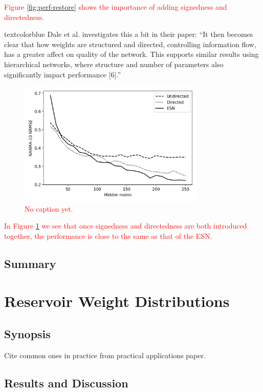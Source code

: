 \textcolor{red}{
  Figure \ref{fig:perf-restore} shows the importance of adding signedness and
directedness.
}

textcolor{blue}{
  Dale et al. investigates this a bit in their paper: ``It then becomes clear
that how weights are structured and directed, controlling information flow, has
a greater affect on quality of the network. This supports similar results using
hierarchical networks, where structure and number of parameters also
significantly impact performance [6].''
}

\begin{figure}[t]
  \centering
  \includegraphics[width=3.5in]{figures/perf-rest-comp.png}
  \caption{
    \textcolor{red}{
      No caption yet.
    }
  }
  \label{fig:perf-rest-comp}
\end{figure}

\textcolor{red}{
  In Figure \ref{fig:perf-rest-comp} we see that once signedness and
directedness are both introduced together, the performance is close to the same
as that of the ESN.
}

\subsection{Summary}

\section{Reservoir Weight Distributions}

\subsection{Synopsis}

Cite common ones in practice from practical applications paper.

\subsection{Results and Discussion}

